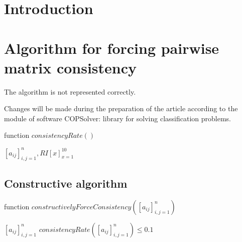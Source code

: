 \documentclass[authoryear,manuscript,12pt]{elsarticle}
\begin{document}

\section{Introduction}
\label{sec:intro}



\section{Algorithm for forcing pairwise matrix consistency}

The algorithm is not represented correctly. 

Changes will be made during the preparation of the article according to the module of software COPSolver: library for solving classification problems.

\begin{algorithm}
\caption{function $consistencyRate()$}\label{alg:CA}
\begin{algorithmic}
\Require $[a_{ij}]_{i,j=1}^{n}, RI[x]_{x=1}^{10}$
\end{algorithmic}
\end{algorithm}

\subsection{Constructive algorithm}

\begin{algorithm}
\caption{function $constructivelyForceConsistency([a_{ij}]_{i,j=1}^{n})$}\label{alg:CA}
\begin{algorithmic}
\Require $[a_{ij}]_{i,j=1}^{n}$
\Ensure $consistencyRate([a_{ij}]_{i,j=1}^{n}) \leq 0.1$
\Else
		\EndIf
	\EndFor
\EndIf
{}

\end{algorithmic}
\end{algorithm}
\end{document}
